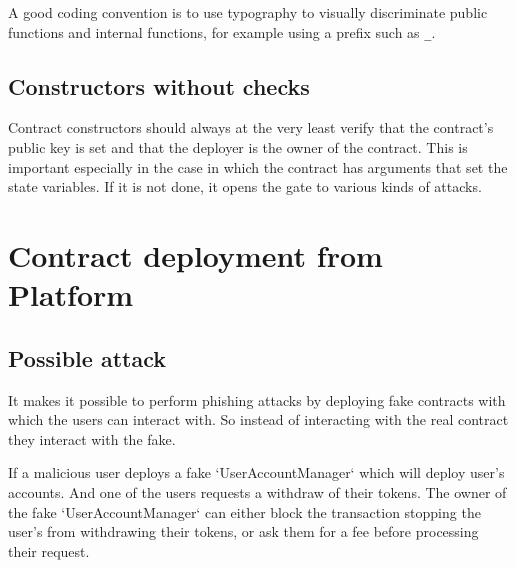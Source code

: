 A good coding convention is to use typography to visually discriminate public functions and internal functions, for example using a prefix such as {\tt \_}.

\subsection{Constructors without checks}
\label{constructor:check}

Contract constructors should always at the very least verify that the contract's public key is set and that the deployer is the owner of the contract. This is important especially in the case in which the contract has arguments that set the state variables. If it is not done, it opens the gate to various kinds of attacks.

\section{Contract deployment from Platform}


\subsection{Possible attack}

It makes it possible to perform phishing attacks by deploying fake contracts with which the users can interact with. So instead of interacting with the real contract they interact with the fake. 

If a malicious user deploys a fake `UserAccountManager` which will deploy user's accounts. And one of the users requests a withdraw of their tokens. The owner of the fake `UserAccountManager` can either block the transaction stopping the user's from withdrawing their tokens, or ask them for a fee before processing their request.


